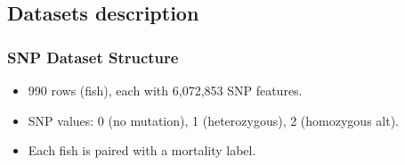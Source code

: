 \documentclass[aspectratio=169]{beamer}
\begin{document}
\subsection{Datasets description}
\begin{frame}
\frametitle{SNP Dataset Structure}
\begin{minipage}{0.69\textwidth}
\begin{itemize}
  \item 990 rows (fish), each with 6,072,853 SNP features.
  \item SNP values: 0 (no mutation), 1 (heterozygous), 2 (homozygous alt).
  \item Each fish is paired with a mortality label.
\end{itemize}
\end{minipage}
\begin{minipage}{0.28\textwidth}
\end{minipage}
\vspace{0.5cm}

\end{frame}
\end{document}
